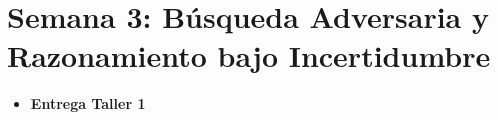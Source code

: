 \chapter{Semana 3: Búsqueda Adversaria y Razonamiento bajo Incertidumbre}

\begin{remark}
\begin{itemize}
    \item \textbf{Entrega Taller 1}
\end{itemize}
\end{remark}





